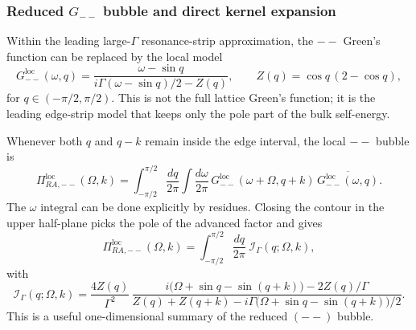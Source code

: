 \documentclass[aps,prx,preprint,amsmath,amssymb]{revtex4-2}
\begin{document}
\subsubsection{Reduced \texorpdfstring{$G_{--}$}{G--} bubble and direct kernel expansion}

Within the leading large-\(\Gamma\) resonance-strip approximation, the
\(--\) Green's function can be replaced by the local model
\begin{equation}
\label{eq:Gmm-local-app}
G_{--}^{\mathrm{loc}}(\omega,q)
=
\frac{\omega-\sin q}{i\Gamma(\omega-\sin q)/2-Z(q)},
\qquad
Z(q)=\cos q\,(2-\cos q),
\end{equation}
for \(q\in(-\pi/2,\pi/2)\).  This is not the full lattice Green's function; it
is the leading edge-strip model that keeps only the pole part of the bulk
self-energy.

Whenever both \(q\) and \(q-k\) remain inside the edge interval, the local
\(--\) bubble is
\[
\Pi_{RA,--}^{\mathrm{loc}}(\Omega,k)
=
\int_{-\pi/2}^{\pi/2}\frac{dq}{2\pi}
\int\frac{d\omega}{2\pi}\,
G_{--}^{\mathrm{loc}}(\omega+\Omega,q+k)\,
\overline{G_{--}^{\mathrm{loc}}(\omega,q)}.
\]
The \(\omega\) integral can be done explicitly by residues.  Closing the
contour in the upper half-plane picks the pole of the advanced factor and gives
\begin{equation}
\label{eq:Gmm-local-kernel-app}
\Pi_{RA,--}^{\mathrm{loc}}(\Omega,k)
=
\int_{-\pi/2}^{\pi/2}\frac{dq}{2\pi}\;
\mathcal I_\Gamma(q;\Omega,k),
\end{equation}
with
\begin{equation}
\label{eq:Gmm-local-kernel-density-app}
\mathcal I_\Gamma(q;\Omega,k)
=
\frac{4 Z(q)}{\Gamma^2}\,
\frac{i\bigl(\Omega+\sin q-\sin(q+k)\bigr)-2Z(q)/\Gamma}
{Z(q)+Z(q+k)-i\Gamma\bigl(\Omega+\sin q-\sin(q+k)\bigr)/2}.
\end{equation}
This is a useful one-dimensional summary of the reduced \((--)\) bubble.
\end{document}

